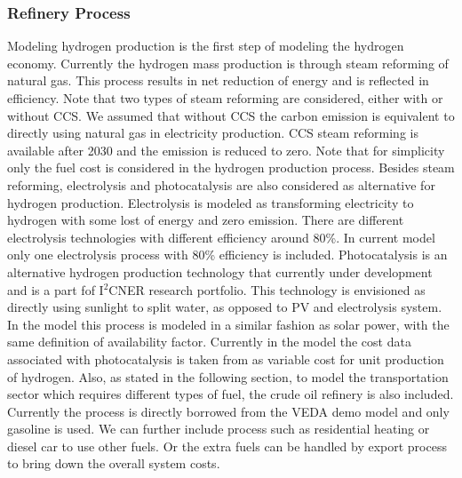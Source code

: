 \documentclass[14pt,a4paper]{article} %
\begin{document}
\subsubsection{Refinery Process}
Modeling hydrogen production is the first step of modeling the hydrogen economy. Currently the hydrogen mass production is through steam reforming of natural gas. This process results in net reduction of energy and is reflected in efficiency\cite{sheet2005hydrogen}. Note that two types of steam reforming are considered, either with or without CCS. We assumed that without CCS the carbon emission is equivalent to directly using natural gas in electricity production. CCS steam reforming is available after 2030 and the emission is reduced to zero. Note that for simplicity only the fuel cost is considered in the hydrogen production process.
Besides steam reforming, electrolysis and photocatalysis are also considered as alternative for hydrogen production. Electrolysis is modeled as transforming electricity to hydrogen with some lost of energy and zero emission. There are different electrolysis technologies with different efficiency around 80\%\cite{ursua2011hydrogen}. In current model only one electrolysis process with 80\% efficiency is included.
Photocatalysis is an alternative hydrogen production technology that currently under development and is a part fof I$^2$CNER research portfolio. This technology is envisioned as directly using sunlight to split water, as opposed to PV and electrolysis system. In the model this process is modeled in a similar fashion as solar power, with the same definition of availability factor. Currently in the model the cost data associated with photocatalysis is taken from \cite{pinaud2013technical} as variable cost for unit production of hydrogen.
Also, as stated in the following section, to model the transportation sector which requires different types of fuel, the crude oil refinery is also included. Currently the process is directly borrowed from the VEDA demo model and only gasoline is used. We can further include process such as residential heating or diesel car to use other fuels. Or the extra fuels can be handled by export process to bring down the overall system costs.
\end{document}
